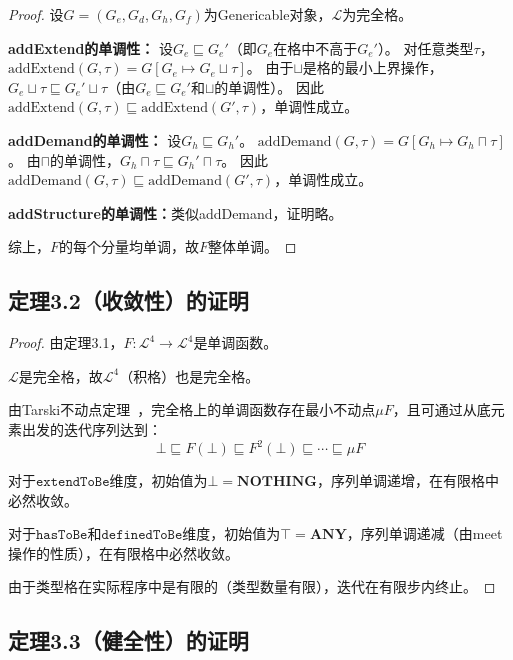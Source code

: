 \documentclass[UTF8]{article}
\newcommand{\NOTHING}{\mathbf{NOTHING}}
\newcommand{\ANY}{\mathbf{ANY}}
\newcommand{\extendToBe}{\texttt{extendToBe}}
\newcommand{\hasToBe}{\texttt{hasToBe}}
\newcommand{\definedToBe}{\texttt{definedToBe}}
\begin{document}
\begin{proof}
设$G = (G_e, G_d, G_h, G_f)$为Genericable对象，$\mathcal{L}$为完全格。

\textbf{addExtend的单调性：}
设$G_e \sqsubseteq G_e'$（即$G_e$在格中不高于$G_e'$）。
对任意类型$\tau$，$\text{addExtend}(G, \tau) = G[G_e \mapsto G_e \sqcup \tau]$。
由于$\sqcup$是格的最小上界操作，$G_e \sqcup \tau \sqsubseteq G_e' \sqcup \tau$（由$G_e \sqsubseteq G_e'$和$\sqcup$的单调性）。
因此$\text{addExtend}(G, \tau) \sqsubseteq \text{addExtend}(G', \tau)$，单调性成立。

\textbf{addDemand的单调性：}
设$G_h \sqsubseteq G_h'$。
$\text{addDemand}(G, \tau) = G[G_h \mapsto G_h \sqcap \tau]$。
由$\sqcap$的单调性，$G_h \sqcap \tau \sqsubseteq G_h' \sqcap \tau$。
因此$\text{addDemand}(G, \tau) \sqsubseteq \text{addDemand}(G', \tau)$，单调性成立。

\textbf{addStructure的单调性：}类似addDemand，证明略。

综上，$F$的每个分量均单调，故$F$整体单调。
\end{proof}

\subsection{定理3.2（收敛性）的证明}

\begin{proof}
由定理3.1，$F: \mathcal{L}^4 \to \mathcal{L}^4$是单调函数。

$\mathcal{L}$是完全格，故$\mathcal{L}^4$（积格）也是完全格。

由Tarski不动点定理~\cite{tarski1955}，完全格上的单调函数存在最小不动点$\mu F$，且可通过从底元素出发的迭代序列达到：
$$\bot \sqsubseteq F(\bot) \sqsubseteq F^2(\bot) \sqsubseteq \cdots \sqsubseteq \mu F$$

对于$\extendToBe$维度，初始值为$\bot = \NOTHING$，序列单调递增，在有限格中必然收敛。

对于$\hasToBe$和$\definedToBe$维度，初始值为$\top = \ANY$，序列单调递减（由meet操作的性质），在有限格中必然收敛。

由于类型格在实际程序中是有限的（类型数量有限），迭代在有限步内终止。
\end{proof}

\subsection{定理3.3（健全性）的证明}
\end{document}
